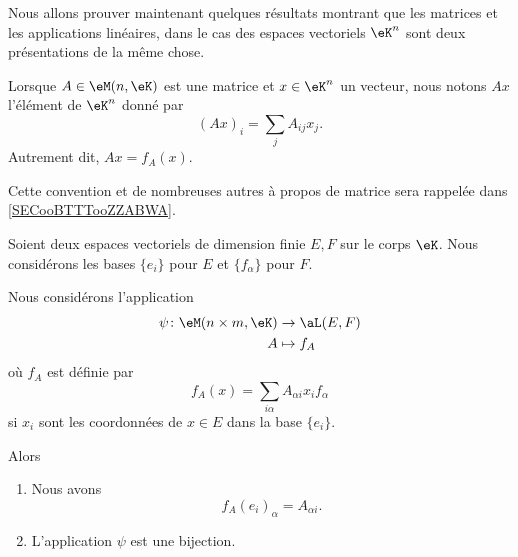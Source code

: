 Nous allons prouver maintenant quelques résultats montrant que les matrices et les applications linéaires, dans le cas des espaces vectoriels \( \eK^n\) sont deux présentations de la même chose.

\begin{normaltext}
    Lorsque \( A\in \eM(n,\eK)\) est une matrice et \( x\in \eK^n\) un vecteur, nous notons \( Ax\) l'élément de \( \eK^n\) donné par
    \begin{equation}        \label{EQooQFVTooMFfzol}
        (Ax)_i=\sum_jA_{ij}x_j.
    \end{equation}
    Autrement dit, \( Ax=f_A(x)\).

    Cette convention et de nombreuses autres à propos de matrice sera rappelée dans \ref{SECooBTTTooZZABWA}.
\end{normaltext}

\begin{proposition}      \label{PROPooGXDBooHfKRrv}
    Soient deux espaces vectoriels de dimension finie \( E,F\) sur le corps \( \eK\). Nous considérons les bases \( \{ e_i \}\) pour \( E\) et \( \{ f_{\alpha} \}\) pour \( F\). 

    Nous considérons l'application
    \begin{equation}
        \begin{aligned}
            \psi\colon \eM(n\times m, \eK)&\to \aL(E,F) \\
            A&\mapsto f_A 
        \end{aligned}
    \end{equation}
    où \( f_A\) est définie par
    \begin{equation}
        f_A(x)=\sum_{i\alpha}A_{\alpha i}x_if_{\alpha}
    \end{equation}
    si \( x_i\) sont les coordonnées de \( x\in E\) dans la base \( \{ e_i \}\).

    Alors
    \begin{enumerate}
        \item       \label{ITEMooKZYYooZPTkpq}
            Nous avons
            \begin{equation}
                f_A(e_i)_{\alpha}=A_{\alpha i}.
            \end{equation}
        \item       \label{ITEMooHSMLooRJZref}
            L'application \( \psi\) est une bijection.
    \end{enumerate}
\end{proposition}

